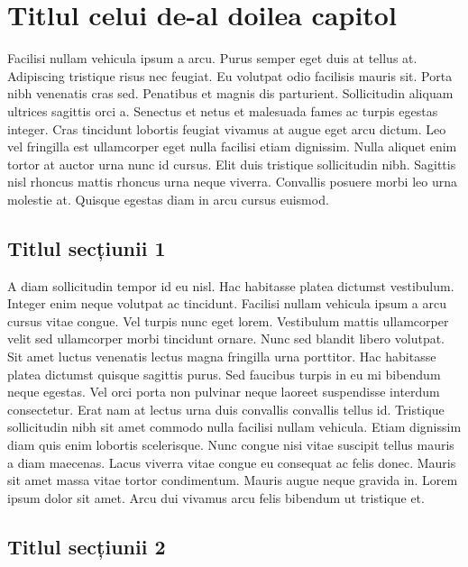 \chapter{Titlul celui de-al doilea capitol}
Facilisi nullam vehicula ipsum a arcu. Purus semper eget duis at tellus at. Adipiscing tristique risus nec feugiat. Eu volutpat odio facilisis mauris sit. Porta nibh venenatis cras sed. Penatibus et magnis dis parturient. Sollicitudin aliquam ultrices sagittis orci a. Senectus et netus et malesuada fames ac turpis egestas integer. Cras tincidunt lobortis feugiat vivamus at augue eget arcu dictum. Leo vel fringilla est ullamcorper eget nulla facilisi etiam dignissim. Nulla aliquet enim tortor at auctor urna nunc id cursus. Elit duis tristique sollicitudin nibh. Sagittis nisl rhoncus mattis rhoncus urna neque viverra. Convallis posuere morbi leo urna molestie at. Quisque egestas diam in arcu cursus euismod.

\section{Titlul secțiunii 1}

A diam sollicitudin tempor id eu nisl. Hac habitasse platea dictumst vestibulum. Integer enim neque volutpat ac tincidunt. Facilisi nullam vehicula ipsum a arcu cursus vitae congue. Vel turpis nunc eget lorem. Vestibulum mattis ullamcorper velit sed ullamcorper morbi tincidunt ornare. Nunc sed blandit libero volutpat. Sit amet luctus venenatis lectus magna fringilla urna porttitor. Hac habitasse platea dictumst quisque sagittis purus. Sed faucibus turpis in eu mi bibendum neque egestas. Vel orci porta non pulvinar neque laoreet suspendisse interdum consectetur. Erat nam at lectus urna duis convallis convallis tellus id. Tristique sollicitudin nibh sit amet commodo nulla facilisi nullam vehicula. Etiam dignissim diam quis enim lobortis scelerisque. Nunc congue nisi vitae suscipit tellus mauris a diam maecenas. Lacus viverra vitae congue eu consequat ac felis donec. Mauris sit amet massa vitae tortor condimentum. Mauris augue neque gravida in. Lorem ipsum dolor sit amet. Arcu dui vivamus arcu felis bibendum ut tristique et.

\section{Titlul secțiunii 2}

